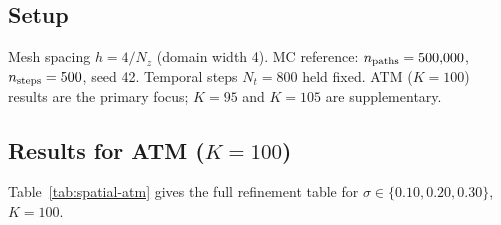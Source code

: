 \documentclass[11pt,a4paper]{article}
\newcommand{\Nz}{N_z}
\newcommand{\Nt}{N_t}
\begin{document}
\subsection{Setup}

Mesh spacing $h = 4/\Nz$ (domain width 4).  MC reference:
$n_{\rm paths} = 500{,}000$, $n_{\rm steps} = 500$, seed 42.
Temporal steps $\Nt = 800$ held fixed.  ATM ($K = 100$) results are
the primary focus; $K = 95$ and $K = 105$ are supplementary.

\subsection{Results for ATM ($K = 100$)}

Table~\ref{tab:spatial-atm} gives the full refinement table for
$\sigma \in \{0.10, 0.20, 0.30\}$, $K = 100$.
\end{document}
